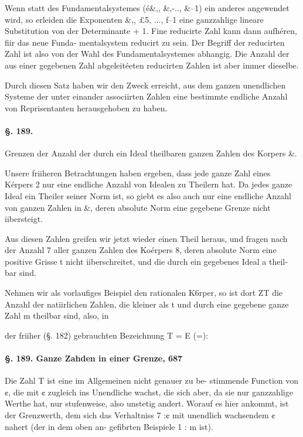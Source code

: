 \documentclass[12pt,a4paper]{article}
\theoremstyle{plain}
\theoremstyle{definition}
\begin{document}
Wenn statt des Fundamentalsystemes (é\&,, \&,-.., \&--1) ein anderes angewendet wird, so erleiden die Exponenten \&,, £5, ..., f--1 eine ganzzahlige lineare Substitution von der Determinante + 1. Fine reducirte Zahl kann dann aufhéren, fiir das neue Funda- mentalsystem reducirt zu sein. Der Begriff der reducirten Zahl ist also von der Wahl des Fundamentalsystemes abhangig. Die Anzahl der aus einer gegebenen Zahl abgeleitéeten reducirten Zahlen ist aber immer dieselbe.

Durch diesen Satz haben wir den Zweck erreicht, aus dem ganzen unendlichen Systeme der unter einander associirten Zahlen eine bestimmte endliche Anzahl von Reprisentanten herausgehoben zu haben.

\paragraph{§. 189.}

Grenzen der Anzahl der durch ein Ideal theilbaren ganzen Zahlen des Korpers \&.

Unsere friiheren Betrachtungen haben ergeben, dass jede ganze Zahl eines Kérpers 2 nur eine endliche Anzahl von Idealen zu Theilern hat. Da jedes ganze Ideal ein Theiler seiner Norm ist, so giebt es also auch nur eine endliche Anzahl von ganzen Zahlen in \&, deren absolute Norm eine gegebene Grenze nicht iibersteigt.

Aus diesen Zahlen greifen wir jetzt wieder einen Theil heraus, und fragen nach der Anzahl 7 aller ganzen Zahlen des Koérpers 8, deren absolute Norm eine positive Grisse t nicht iiberschreitet, und die durch ein gegebenes Ideal a theil- bar sind.

Nehmen wir als vorlaufiges Beispiel den rationalen K6rper, so ist dort ZT die Anzahl der natiirlichen Zahlen, die kleiner als t und durch eine gegebene ganze Zahl m theilbar sind, also, in

der friiher (§. 182) gebrauchten Bezeichnung T = E (=):

\paragraph{§. 189. Ganze Zahden in einer Grenze, 687}

Die Zahl T ist eine im Allgemeinen nicht genauer zu be- stimmende Function von ¢, die mit ¢ zugleich ins Unendliche wachst, die sich aber, da sie nur ganzzahlige Werthe hat, nur stufenweise, also unstetig andert. Worauf es hier ankommt, ist der Grenzwerth, dem sich das Verhaltniss 7 :¢ mit unendlich wachsendem ¢ nahert (der in dem oben an- gefibrten Beispiele 1 : m ist).
\end{document}
